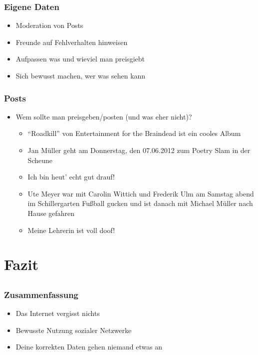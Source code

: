 \documentclass[12pt]{beamer}
\begin{document}
\begin{frame}
  \frametitle{Eigene Daten}
    \begin{itemize}
      \item<2->Moderation von Posts
      \item<3->Freunde auf Fehlverhalten hinweisen
      \item<4->Aufpassen was und wieviel man preisgiebt
      \item<5->Sich bewusst machen, wer was sehen kann
    \end{itemize}
\end{frame}

\begin{frame}
  \frametitle{Posts}
  \begin{itemize}
    \item Wem sollte man preisgeben/posten (und was eher nicht)?
      \begin{itemize}
        \item<2-> "`Roadkill"' von Entertainment for the Braindead ist ein cooles Album
        \item<3-> Jan Müller geht am Donnerstag, den 07.06.2012 zum Poetry Slam in der Scheune
        \item<4-> Ich bin heut' echt gut drauf!
        \item<5-> Ute Meyer war mit Carolin Wittich und Frederik Ulm am Samstag abend im Schillergarten Fußball gucken und ist danach mit Michael Müller nach Hause gefahren
        \item<6-> Meine Lehrerin ist voll doof!
      \end{itemize}
  \end{itemize}
\end{frame}

\section{Fazit}
\subsection{}

\begin{frame}
  \frametitle{Zusammenfassung}
  \begin{itemize}
    \item Das Internet vergisst nichts
    \item Bewusste Nutzung sozialer Netzwerke
    \item Deine korrekten Daten gehen niemand etwas an
  \end{itemize}
\end{frame}
\end{document}

